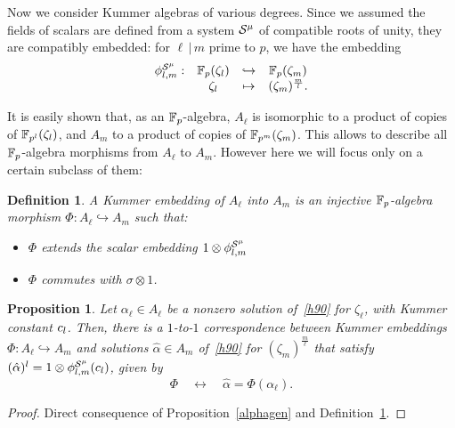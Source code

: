 \documentclass{sig-alternate}
\newtheorem{proposition}[theorem]{Proposition}
\newtheorem{definition}[theorem]{Definition}
\begin{document}
Now we consider Kummer algebras of various degrees.
Since we assumed the fields of scalars are defined from a system $\mathcal{S}^\mu$
of compatible roots of unity,
they are compatibly embedded:
for $\ell\,|\,m$ prime to $p$, we have the embedding
\[
\begin{array}{cccc}
  {\phi^{\mathcal{S}^\mu}_{{l},{m}}}: & \mathbb{F}_{p}(\zeta_l) & \hookrightarrow & \mathbb{F}_{p}(\zeta_m) \\
  & \zeta_l & \mapsto & (\zeta_{m})^{\frac{m}{l}}.
\end{array}
\]

It is easily shown that, as an $\mathbb{F}_{p}$-algebra, $A_\ell$ is isomorphic to a product of copies of $\mathbb{F}_{p^l}(\zeta_l)$,
and $A_m$ to a product of copies of $\mathbb{F}_{p^m}(\zeta_m)$.
This allows to describe all $\mathbb{F}_{p}$-algebra morphisms from $A_\ell$ to $A_m$. However here we will focus only on a certain
subclass of them:
\begin{definition}
\label{Kembedding}
A \emph{Kummer embedding} of $A_\ell$ into $A_m$ is an \emph{injective} $\mathbb{F}_{p}$-algebra morphism $\Phi:A_\ell\hookrightarrow A_m$
such that:
\begin{itemize}
\item $\Phi$ extends the scalar embedding $1\otimes{\phi^{\mathcal{S}^\mu}_{{l},{m}}}$
\item $\Phi$ commutes with $\sigma\otimes1$.
\end{itemize}
\end{definition}

\begin{proposition}
\label{Phialpha}
Let $\alpha_\ell\in A_\ell$ be a nonzero solution of~\eqref{h90} for $\zeta_\ell$, with Kummer constant $c_l$.
Then, there is a $1$-to-$1$ correspondence between Kummer embeddings $\Phi:A_\ell\hookrightarrow A_m$ and solutions $\hat{\alpha}\in A_m$
of~\eqref{h90} for $(\zeta_m)^{\frac{m}{\ell}}$ that satisfy $(\hat{\alpha})^l=1\otimes{\phi^{\mathcal{S}^\mu}_{{l},{m}}}(c_l)$,
given by \[ \Phi\quad\longleftrightarrow\quad\hat{\alpha}=\Phi(\alpha_\ell). \]
\end{proposition}
\begin{proof}
Direct consequence of Proposition~\ref{alphagen} and Definition~\ref{Kembedding}.
\end{proof}
\end{document}

